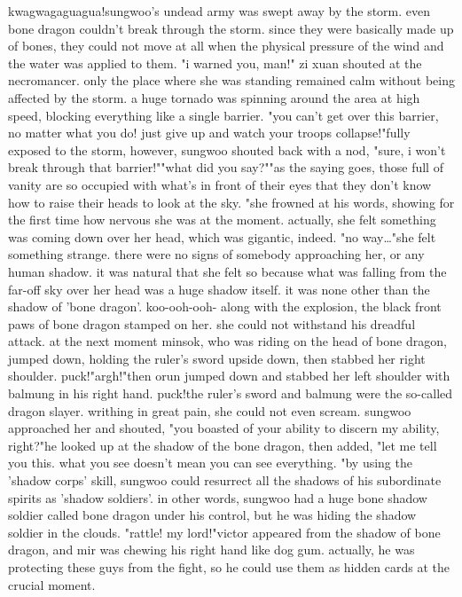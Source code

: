 kwagwagaguagua!sungwoo's undead army was swept away by the storm.
 even bone dragon couldn't break through the storm.
since they were basically made up of bones, they could not move at all when the physical pressure of the wind and the water was applied to them.
"i warned you, man!" zi xuan shouted at the necromancer.
only the place where she was standing remained calm without being affected by the storm.
a huge tornado was spinning around the area at high speed, blocking everything like a single barrier.
"you can't get over this barrier, no matter what you do! just give up and watch your troops collapse!"fully exposed to the storm, however, sungwoo shouted back with a nod, "sure, i won't break through that barrier!""what did you say?""as the saying goes, those full of vanity are so occupied with what's in front of their eyes that they don't know how to raise their heads to look at the sky.
"she frowned at his words, showing for the first time how nervous she was at the moment.
actually, she felt something was coming down over her head, which was gigantic, indeed.
"no way…"she felt something strange.
 there were no signs of somebody approaching her, or any human shadow.
it was natural that she felt so because what was falling from the far-off sky over her head was a huge shadow itself.
 it was none other than the shadow of 'bone dragon'.
koo-ooh-ooh-
along with the explosion, the black front paws of bone dragon stamped on her.
 she could not withstand his dreadful attack.
 at the next moment minsok, who was riding on the head of bone dragon, jumped down, holding the ruler's sword upside down, then stabbed her right shoulder.
puck!"argh!"then orun jumped down and stabbed her left shoulder with balmung in his right hand.
puck!the ruler's sword and balmung were the so-called dragon slayer.
 writhing in great pain, she could not even scream.
sungwoo approached her and shouted, "you boasted of your ability to discern my ability, right?"he looked up at the shadow of the bone dragon, then added, "let me tell you this.
 what you see doesn't mean you can see everything.
"by using the 'shadow corps' skill, sungwoo could resurrect all the shadows of his subordinate spirits as 'shadow soldiers'.
 in other words, sungwoo had a huge bone shadow soldier called bone dragon under his control, but he was hiding the shadow soldier in the clouds.
"rattle! my lord!"victor appeared from the shadow of bone dragon, and mir was chewing his right hand like dog gum.
 actually, he was protecting these guys from the fight, so he could use them as hidden cards at the crucial moment.
